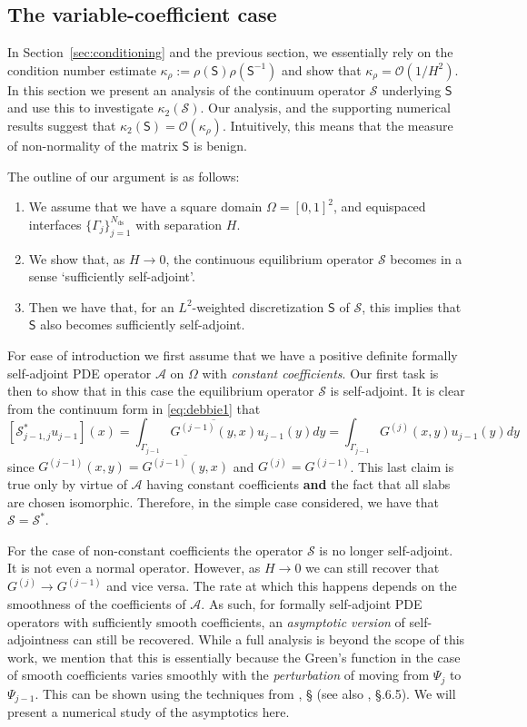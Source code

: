 \documentclass[final,onefignum,onetabnum]{siamart250211}
\newcommand{\mtx}[1]{\bm{\mathsf{#1}}}
\theoremstyle{definition}
\newcommand{\RN}[1]
    {\MakeUppercase{\romannumeral #1}}
\begin{document}
\subsection{The variable-coefficient case}\label{app:spectraHtozero}
In Section~\ref{sec:conditioning} and the previous section, we essentially rely on the condition number estimate $\kappa_{\rho}:=\rho(\mtx{S})\rho(\mtx{S}^{-1})$ and show that $\kappa_{\rho}=\mathcal{O}(1/H^2)$. In this section we present an analysis of the continuum operator $\mathcal{S}$ underlying $\mtx{S}$ and use this to investigate $\kappa_{2}(\mathcal{S})$. Our analysis, and the supporting numerical results suggest that $\kappa_{2}(\mtx{S}) = \mathcal{O}(\kappa_{\rho})$. Intuitively, this means that the measure of non-normality of the matrix $\mtx{S}$ is benign.

The outline of our argument is as follows:
\begin{enumerate}
    \item We assume that we have a square domain $\Omega=[0,1]^2$, and equispaced interfaces $\{\Gamma_j\}_{j=1}^{N_{\text{ds}}}$ with separation $H$.
    \item We show that, as $H\rightarrow 0$, the continuous equilibrium operator $\mathcal{S}$ becomes in a sense `sufficiently self-adjoint'.
    \item Then we have that, for an $L^2$-weighted discretization $\mtx{S}$ of $\mathcal{S}$, this implies that $\mtx{S}$ also becomes sufficiently self-adjoint.
\end{enumerate}

For ease of introduction we first assume that we have a positive definite formally self-adjoint PDE operator $\mathcal{A}$ on $\Omega$ with \textit{constant coefficients}. Our first task is then to show that in this case the equilibrium operator $\mathcal{S}$ is self-adjoint. It is clear from the continuum form in \ref{eq:debbie1} that
$$[\mathcal{S}^*_{j-1,j}u_{j-1}](x)=\int_{\Gamma_{j-1}}\overline{G^{(j-1)}(y,x)}u_{j-1}(y)dy=\int_{\Gamma_{j-1}}G^{(j)}(x,y)u_{j-1}(y)dy$$
since $G^{(j-1)}(x,y)=\overline{G^{(j-1)}(y,x)}$ and $G^{(j)}=G^{(j-1)}$. This last claim is true only by virtue of $\mathcal{A}$ having constant coefficients \textbf{and} the fact that all slabs are chosen isomorphic. Therefore, in the simple case considered, we have that $\mathcal{S} = \mathcal{S}^*$.

For the case of non-constant coefficients the operator $\mathcal{S}$ is no longer self-adjoint. It is not even a normal operator. However, as $H\rightarrow 0$ we can still recover that $G^{(j)}\rightarrow G^{(j-1)}$ and vice versa. The rate at which this happens depends on the smoothness of the coefficients of $\mathcal{A}$. As such, for formally self-adjoint PDE operators with sufficiently smooth coefficients, an \textit{asymptotic version} of self-adjointness can still be recovered. While a full analysis is beyond the scope of this work, we mention that this is essentially because the Green's function in the case of smooth coefficients varies smoothly with the \textit{perturbation} of moving from $\Psi_j$ to $\Psi_{j-1}$. This can be shown using the techniques from \cite{GarabedianSchiffer}, \S \RN{2} (see also \cite{Kato}, \S \RN{7}.6.5). We will present a numerical study of the asymptotics here.
\end{document}
